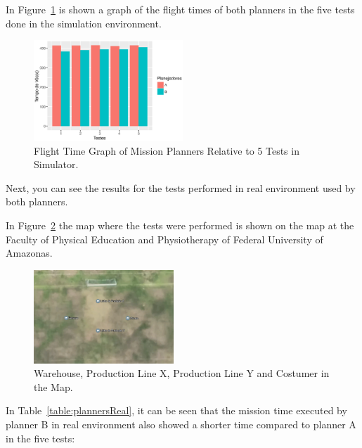\documentclass[conference,harvard,brazil,english]{sbatex}
\begin{document}
In Figure~\ref{fig:GraPlannersSimulado} is shown a graph of the flight times of both planners in the five tests done in the simulation environment.

\begin{figure}[H]
	\centering
	\includegraphics[width=0.5\textwidth]{GraPlannersSimulado.eps}
	\caption{Flight Time Graph of Mission Planners Relative to 5 Tests in Simulator.\label{fig:GraPlannersSimulado}}
	\end{figure}
	
	Next, you can see the results for the tests performed in real environment used by both planners.
	
	In Figure~\ref{fig:maps} the map where the tests were performed is shown on the map at the Faculty of Physical Education and Physiotherapy of Federal University of Amazonas.
	
		\begin{figure}[H]
	\centering
	\includegraphics[width=0.47\textwidth]{mapsUseCase.PNG}
	\caption{Warehouse, Production Line X, Production Line Y and Costumer in the Map.\label{fig:maps}}
	\end{figure}
	
	In Table~\ref{table:plannersReal}, it can be seen that the mission time executed by planner B in real environment also showed a shorter time compared to planner A in the five tests:
	
\end{document}

